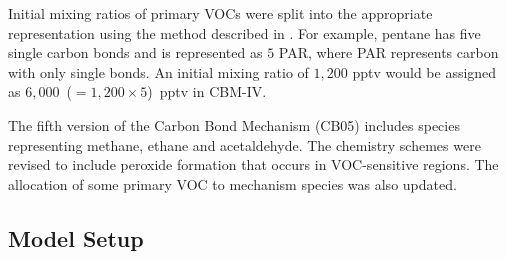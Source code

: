 Initial mixing ratios of primary VOCs were split into the appropriate representation using the method described in \citet{Hogo:1989}. 
For example, pentane has five single carbon bonds and is represented as $5$ PAR, where PAR represents carbon with only single bonds. 
An initial mixing ratio of $1,200$ pptv would be assigned as \mbox{$6,000$ ($= 1,200 \times 5$) pptv} in CBM-IV.

The fifth version of the Carbon Bond Mechanism (CB05) \citep{Yarwood:2005} includes species representing methane, ethane and acetaldehyde. 
The chemistry schemes were revised to include peroxide formation that occurs in VOC-sensitive regions. 
The allocation of some primary VOC to mechanism species was also updated.

\subsection{Model Setup} \label{ss:model_setup}

